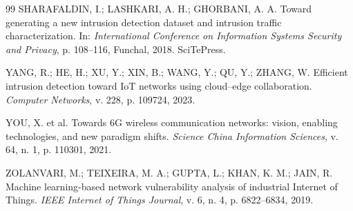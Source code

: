 \documentclass[12pt]{article}
\begin{document}
\begin{thebibliography}{99}
SHARAFALDIN, I.; LASHKARI, A. H.; GHORBANI, A. A. Toward generating a new
intrusion detection dataset and intrusion traffic characterization. In:
\textit{International Conference on Information Systems Security and Privacy},
p. 108--116, Funchal, 2018. SciTePress.

YANG, R.; HE, H.; XU, Y.; XIN, B.; WANG, Y.; QU, Y.; ZHANG, W. Efficient
intrusion detection toward {IoT} networks using cloud--edge collaboration.
\textit{Computer Networks}, v. 228, p. 109724, 2023.

YOU, X. et al. Towards 6G wireless communication networks: vision, enabling
technologies, and new paradigm shifts. \textit{Science China Information
Sciences}, v. 64, n. 1, p. 110301, 2021.

ZOLANVARI, M.; TEIXEIRA, M. A.; GUPTA, L.; KHAN, K. M.; JAIN, R. Machine
learning-based network vulnerability analysis of industrial {Internet of
Things}. \textit{IEEE Internet of Things Journal}, v. 6, n. 4,
p. 6822--6834, 2019.

\end{thebibliography}
\end{document}
